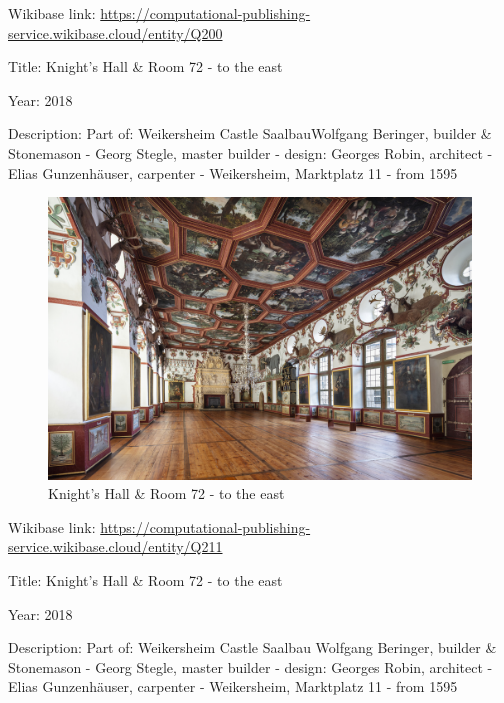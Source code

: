 \documentclass[
  letterpaper,
]{book}
\begin{document}
Wikibase link:
\url{https://computational-publishing-service.wikibase.cloud/entity/Q200}

Title: Knight's Hall \& Room 72 - to the east

Year: 2018

Description: Part of: Weikersheim Castle SaalbauWolfgang Beringer,
builder \& Stonemason - Georg Stegle, master builder - design: Georges
Robin, architect - Elias Gunzenhäuser, carpenter - Weikersheim,
Marktplatz 11 - from 1595

\begin{figure}[H]

{\centering \includegraphics{impressum_files/mediabag/fmd10005859a.jpg}

}

\caption{Knight's Hall \& Room 72 - to the east}

\end{figure}%

Wikibase link:
\url{https://computational-publishing-service.wikibase.cloud/entity/Q211}

Title: Knight's Hall \& Room 72 - to the east

Year: 2018

Description: Part of: Weikersheim Castle Saalbau Wolfgang Beringer,
builder \& Stonemason - Georg Stegle, master builder - design: Georges
Robin, architect - Elias Gunzenhäuser, carpenter - Weikersheim,
Marktplatz 11 - from 1595
\end{document}
